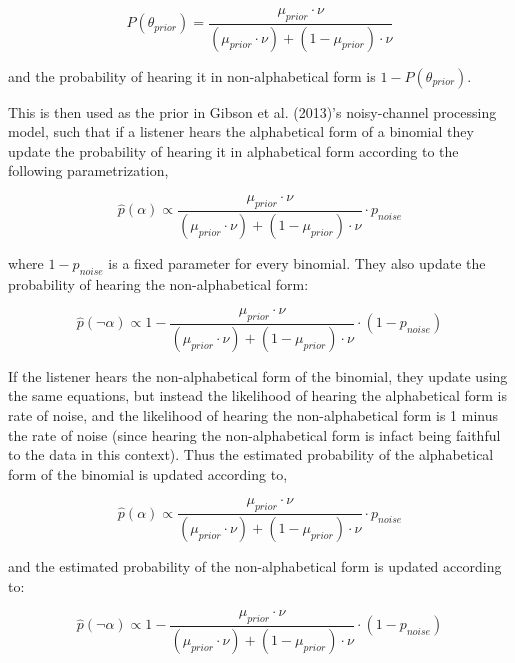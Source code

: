 \documentclass[
  jou,floatsintext]{apa6}
\begin{document}
\begin{equation}
\label{eq:thetaPrior}
P(\theta_{prior}) = \frac{\mu_{prior} \cdot \nu}{(\mu_{prior} \cdot \nu) + (1 - \mu_{prior}) \cdot \nu}
\end{equation}

and the probability of hearing it in non-alphabetical form is \(1-P(\theta_{prior})\).

This is then used as the prior in Gibson et al. (2013)'s noisy-channel processing model, such that if a listener hears the alphabetical form of a binomial they update the probability of hearing it in alphabetical form according to the following parametrization,

\begin{equation}
\label{eq:phatAlpha}
\hat{p}(\alpha) \propto \frac{\mu_{prior} \cdot \nu}{(\mu_{prior} \cdot \nu) + (1 - \mu_{prior}) \cdot \nu} \cdot p_{noise}
\end{equation}

where \(1 - p_{noise}\) is a fixed parameter for every binomial. They also update the probability of hearing the non-alphabetical form:

\begin{equation}
\label{eq:phatNonalpha}
\hat{p}(\neg\alpha) \propto 1 - \frac{\mu_{prior} \cdot \nu}{(\mu_{prior} \cdot \nu) + (1 - \mu_{prior}) \cdot \nu} \cdot (1-p_{noise})
\end{equation}

If the listener hears the non-alphabetical form of the binomial, they update using the same equations, but instead the likelihood of hearing the alphabetical form is rate of noise, and the likelihood of hearing the non-alphabetical form is 1 minus the rate of noise (since hearing the non-alphabetical form is infact being faithful to the data in this context). Thus the estimated probability of the alphabetical form of the binomial is updated according to,

\begin{equation}
\label{eq:phatAlpha2}
\hat{p}(\alpha) \propto \frac{\mu_{prior} \cdot \nu}{(\mu_{prior} \cdot \nu) + (1 - \mu_{prior}) \cdot \nu} \cdot p_{noise} 
\end{equation}

and the estimated probability of the non-alphabetical form is updated according to:

\begin{equation}
\label{eq:phatNonalpha2}
\hat{p}(\neg\alpha) \propto 1 - \frac{\mu_{prior} \cdot \nu}{(\mu_{prior} \cdot \nu) + (1 - \mu_{prior}) \cdot \nu} \cdot (1-p_{noise}) 
\end{equation}
\end{document}
